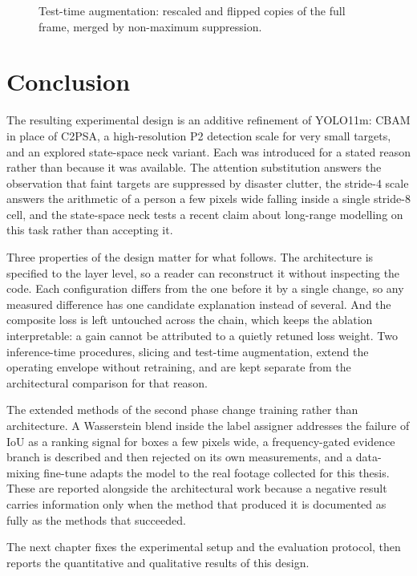 \begin{figure}[tbp]
  \centering
  \caption[Test-time augmentation.]{Test-time augmentation: rescaled and
  flipped copies of the full frame, merged by non-maximum suppression.}
  \label{fig:ttapipe}
\end{figure}

\section{Conclusion}
The resulting experimental design is an additive refinement of YOLO11m: CBAM
in place of C2PSA, a high-resolution P2 detection scale for very small targets,
and an explored state-space neck variant. Each was introduced for a stated
reason rather than because it was available. The attention substitution answers
the observation that faint targets are suppressed by disaster clutter, the
stride-4 scale answers the arithmetic of a person a few pixels wide falling
inside a single stride-8 cell, and the state-space neck tests a recent claim
about long-range modelling on this task rather than accepting it.

Three properties of the design matter for what follows. The architecture is
specified to the layer level, so a reader can reconstruct it without inspecting
the code. Each configuration differs from the one before it by a single change,
so any measured difference has one candidate explanation instead of several.
And the composite loss is left untouched across the chain, which keeps the
ablation interpretable: a gain cannot be attributed to a quietly retuned loss
weight. Two inference-time procedures, slicing and test-time augmentation,
extend the operating envelope without retraining, and are kept separate from
the architectural comparison for that reason.

The extended methods of the second phase change training rather than
architecture. A Wasserstein blend inside the label assigner addresses the
failure of IoU as a ranking signal for boxes a few pixels wide, a
frequency-gated evidence branch is described and then rejected on its own
measurements, and a data-mixing fine-tune adapts the model to the real footage
collected for this thesis. These are reported alongside the architectural work
because a negative result carries information only when the method that
produced it is documented as fully as the methods that succeeded.

The next chapter fixes the experimental setup and the evaluation protocol, then
reports the quantitative and qualitative results of this design.
